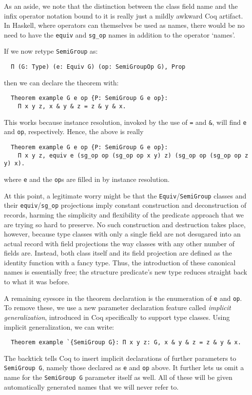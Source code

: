 \documentclass[a4paper,10pt,runningheads]{llncs}
\begin{document}
As an aside, we note that the distinction between the class field name and the infix operator notation bound to it is really just a mildly awkward Coq artifact. In Haskell, where operators can themselves be used as names, there would be no need to have the \lstinline|equiv| and \lstinline|sg_op| names in addition to the operator `names'.

If we now retype \lstinline|SemiGroup| as:
\begin{lstlisting}
  Π (G: Type) (e: Equiv G) (op: SemiGroupOp G), Prop
\end{lstlisting}
then we can declare the theorem with:
\begin{lstlisting}
  Theorem example G e op {P: SemiGroup G e op}:
    Π x y z, x & y & z = z & y & x.
\end{lstlisting}
This works because instance resolution, invoked by the use of \lstinline|=| and \lstinline|&|, will find \lstinline|e| and \lstinline|op|, respectively. Hence, the above is really

\begin{lstlisting}
  Theorem example G e op {P: SemiGroup G e op}:
    Π x y z, equiv e (sg_op op (sg_op op x y) z) (sg_op op (sg_op op z y) x).
\end{lstlisting}
where \lstinline|e| and the \lstinline|op|s are filled in by instance resolution.

At this point, a legitimate worry might be that the \lstinline|Equiv|/\lstinline|SemiGroup| classes and their \lstinline|equiv|/\lstinline|sg_op| projections imply constant construction and deconstruction of records, harming the simplicity and flexibility of the predicate approach that we are trying so hard to preserve. No such construction and destruction takes place, however, because type classes with only a single field are not desugared into an actual record with field projections the way classes with any other number of fields are. Instead, both class itself and its field projection are defined as the identity function with a fancy type. Thus, the introduction of these canonical names is essentially free; the structure predicate's new type reduces straight back to what it was before.

A remaining eyesore in the theorem declaration is the enumeration of \lstinline|e| and \lstinline|op|. To remove these, we use a new parameter declaration feature called \emph{implicit generalization}, introduced in Coq specifically to support type classes. Using implicit generalization, we can write:
\begin{lstlisting}
  Theorem example `{SemiGroup G}: Π x y z: G, x & y & z = z & y & x.
\end{lstlisting}
The backtick tells Coq to insert implicit declarations of further parameters to \lstinline|SemiGroup G|, namely those declared as \lstinline|e| and \lstinline|op| above. It further lets us omit a name for the \lstinline|SemiGroup G| parameter itself as well. All of these will be given automatically generated names that we will never refer to.
\end{document}

